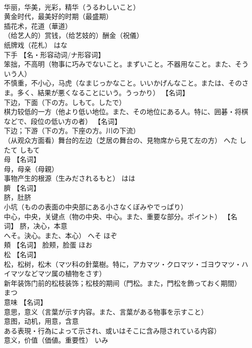 \documentclass[8pt]{extreport}
\begin{document}
\begin{CJK}{UTF8}{min}
\\	华丽，华美，光彩，精华（うるわしいこと） 
\\	黄金时代，最美好的时期（最盛期） 
\\	插花术，花道（華道） 
\\	（给艺人的）赏钱，（给艺妓的）酬金（祝儀） 
\\	纸牌戏（花札）	はな	
\\	下手	【名・形容动词/ナ形容词】 
\\	笨拙，不高明（物事に巧みでないこと。まずいこと。不器用なこと。また、そういう人） 
\\	不慎重，不小心，马虎（なまじっかなこと。いいかげんなこと。または、そのさま。多く、結果が悪くなることにいう。うっかり） 【名词】 
\\	下边，下面（下の方。しもて。したで） 
\\	棋力较低的一方（他より低い地位。また、その地位にある人。特に、囲碁・将棋などで、段位の低い方の者） 【名词】 
\\	下边；下游（下の方。下座の方。川の下流） 
\\	（从观众方面看）舞台的左边（芝居の舞台の、見物席から見て左の方）	へた したて しもて	
\\	母	【名词】 
\\	母，母亲（母親） 
\\	事物产生的根源（生みだされるもと）	はは	
\\	臍	【名词】 
\\	脐，肚脐 
\\	小坑（ものの表面の中央部にある小さなくぼみやでっぱり） 
\\	中心，中央，关键点（物の中央、中心。また、重要な部分。ポイント） 【名词】 脐，决心，本意
\\	へそ。決心。また、本心）	へそ ほぞ	
\\	頬	【名词】 脸颊，脸蛋	ほお	
\\	松	【名词】 
\\	松，松树，松木（マツ科の針葉樹。特に，アカマツ・クロマツ・ゴヨウマツ・ハイマツなどマツ属の植物をさす） 
\\	新年装饰门前的松枝装饰；松枝的期间（門松。また，門松を飾っておく期間）	まつ	
\\	意味	【名词】 
\\	意思，意义（言葉が示す内容。また、言葉がある物事を示すこと） 
\\	意图，动机，用意，含意
\\	ある表現・行為によって示され、或いはそこに含み隠されている内容） 
\\	意义，价值（価値。重要性）	いみ	

\end{CJK}
\end{document}
